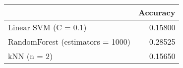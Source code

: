 \begin{tabular}{lr}
\toprule
{} &  Accuracy \\
\midrule
Linear SVM (C = 0.1)             &   0.15800 \\
RandomForest (estimators = 1000) &   0.28525 \\
kNN (n = 2)                      &   0.15650 \\
\bottomrule
\end{tabular}
